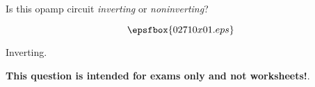 

Is this opamp circuit {\it inverting} or {\it noninverting}?

$$\epsfbox{02710x01.eps}$$







Inverting.







{\bf This question is intended for exams only and not worksheets!}.




